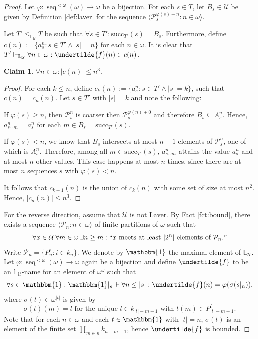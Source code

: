 \documentclass[12pt]{article}
\theoremstyle{definition}
\newtheorem{claim}[nummer]{\sc Claim}
\newcommand\seq{\operatorname{seq}}
\begin{document}
\begin{proof}
Let $\varphi: \seq^{<\omega}(\omega) \to \omega$ be a bijection. For each $s\in T$, let $B_s \in \mathcal{U}$ be given by Definition \ref{def:laver} for the sequence $\langle \mathcal{P}_s^{\varphi(s)+n}: n \in \omega\rangle$.

Let $T' \leq_{\mathbb{L}_{\mathcal{U}}}T$ be such that $\forall s \in T': \text{succ}_{T'}(s)=B_s$. Furthermore, define $c(n):=\{a_s^{n}: s \in T' \land|s|=n\}$ for each $n \in \omega$. It is clear that $T' \Vdash_{\mathbb{L}_{\mathcal{U}}}\forall n \in \omega: \undertilde{f}(n)\in c(n)$.

\begin{claim}
$\forall n \in \omega: |c(n)| \leq n^{3}$.
\end{claim}

\begin{proof}
For each $k \leq n$, define $c_k(n):=\{a_s^{n}: s \in T' \land |s|=k\}$, such that $c(n)=c_n(n)$. Let $s \in T'$ with $|s|=k$ and note the following:

If $\varphi(s)\geq n$, then $\mathcal{P}_s^{n}$ is coarser then $\mathcal{P}_s^{\varphi(n)+0}$ and therefore $B_s \subseteq A_s^n$. Hence, $a_{s^{\smallfrown}m}^n = a_s^{n}$ for each $m \in B_s=\text{succ}_{T'}(s)$.

If $\varphi(s)<n$, we know that $B_s$ intersects at most $n+1$ elements of $\mathcal{P}_s^n$, one of which is $A_s^n$. Therefore, among all $m \in \text{succ}_{T'}(s)$, $a_{s^{\smallfrown}m}^n$ attains the value $a_s^n$ and at most $n$ other values. This case happens at most $n$ times, since there are at most $n$ sequences $s$ with $\varphi(s)<n$.

It follows that $c_{k+1}(n)$ is the union of $c_k(n)$ with some set of size at most $n^2$. Hence, $|c_n(n)|\leq n^3$.
\end{proof}

For the reverse direction, assume that $\mathcal{U}$ is not Laver. By Fact \ref{fct:bound}, there exists a sequence $\langle \mathcal{P}_n: n \in \omega \rangle$ of finite partitions of $\omega$ such that
\[\forall x \in \mathcal{U}\: \forall m \in \omega \: \exists n \geq m: ``x \text{ meets at least }|2^n| \text{ elements of }\mathcal{P}_n."\]
Write $\mathcal{P}_n=\{P_n^{i}: i \in k_n\}$. We denote by $\mathbbm{1}$ the maximal element of $\mathbb{L}_{\mathcal{U}}$. Let $\varphi: \seq ^{<\omega}(\omega)\to \omega$ again be a bijection and define $\undertilde{f}$ to be an $\mathbb{L}_{\mathcal{U}}$-name for an element of $\omega^{\omega}$ such that
\[\forall s \in \mathbbm{1}: \mathbbm{1}|_s \Vdash \forall n \leq |s|: \undertilde{f}(n)=\varphi(\sigma(s|_{n})),\]
where $\sigma(t)\in \omega^{|t|}$ is given by
\[\sigma(t)(m)=l \text{ for the unique } l \in k_{|t|-m-1} \text{ with }t(m) \in P_{|t|-m-1}^l.\]
Note that for each $n \in \omega$ and each $t \in \mathbbm{1}$ with $|t|=n$, $\sigma(t)$ is an element of the finite set $\prod_{m \in n}k_{n-m-1}$, hence $\undertilde{f}$ is bounded.


\end{proof}
\end{document}
